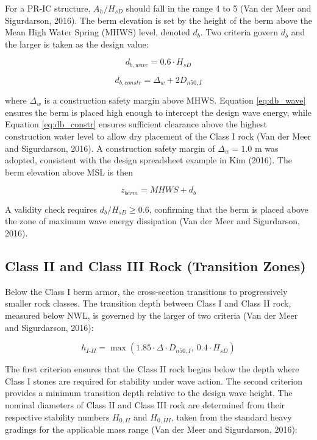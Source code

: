 \documentclass[a4paper, 11pt]{article}
\begin{document}
For a PR-IC structure, $A_h/H_{sD}$ should fall in the range 4 to 5 (Van der Meer and Sigurdarson, 2016). The berm elevation is set by the height of the berm above the Mean High Water Spring (MHWS) level, denoted $d_b$. Two criteria govern $d_b$ and the larger is taken as the design value:

\begin{equation}
    d_{b,wave} = 0.6 \cdot H_{sD}
    \label{eq:db_wave}
\end{equation}

\begin{equation}
    d_{b,constr} = \Delta_w + 2 D_{n50,I}
    \label{eq:db_constr}
\end{equation}

where $\Delta_w$ is a construction safety margin above MHWS. Equation \ref{eq:db_wave} ensures the berm is placed high enough to intercept the design wave energy, while Equation \ref{eq:db_constr} ensures sufficient clearance above the highest construction water level to allow dry placement of the Class I rock (Van der Meer and Sigurdarson, 2016). A construction safety margin of $\Delta_w = 1.0$ m was adopted, consistent with the design spreadsheet example in Kim (2016). The berm elevation above MSL is then

\begin{equation}
    z_{berm} = MHWS + d_b
    \label{eq:berm_elev}
\end{equation}

A validity check requires $d_b/H_{sD} \geq 0.6$, confirming that the berm is placed above the zone of maximum wave energy dissipation (Van der Meer and Sigurdarson, 2016).

\subsection{Class II and Class III Rock (Transition Zones)}
\hspace{0.5cm}Below the Class I berm armor, the cross-section transitions to progressively smaller rock classes. The transition depth between Class I and Class II rock, measured below NWL, is governed by the larger of two criteria (Van der Meer and Sigurdarson, 2016):

\begin{equation}
    h_{I\text{-}II} = \max\left(1.85 \cdot \Delta \cdot D_{n50,I},\ 0.4 \cdot H_{sD}\right)
    \label{eq:transition}
\end{equation}

The first criterion ensures that the Class II rock begins below the depth where Class I stones are required for stability under wave action. The second criterion provides a minimum transition depth relative to the design wave height. The nominal diameters of Class II and Class III rock are determined from their respective stability numbers $H_{0,II}$ and $H_{0,III}$, taken from the standard heavy gradings for the applicable mass range (Van der Meer and Sigurdarson, 2016):
\end{document}
